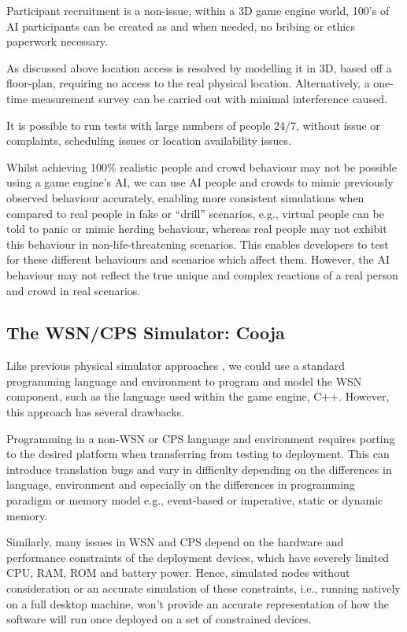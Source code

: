 Participant recruitment is a non-issue, within a 3D game engine world, 100's of AI participants can be created as and when needed, no bribing or ethics paperwork necessary. 

As discussed above location access is resolved by modelling it in 3D, based off a floor-plan, requiring no access to the real physical location. Alternatively, a one-time measurement survey can be carried out with minimal interference caused.

It is possible to run tests with large numbers of people 24/7, without issue or complaints, scheduling issues or location availability issues.

Whilst achieving 100\% realistic people and crowd behaviour may not be possible using a game engine's AI, we can use AI people and crowds to mimic previously observed behaviour accurately, enabling more consistent simulations when compared to real people in fake or ``drill'' scenarios, e.g., virtual people can be told to panic or mimic herding behaviour, whereas real people may not exhibit this behaviour in non-life-threatening scenarios. This enables developers to test for these different behaviours and scenarios which affect them. However, the AI behaviour may not reflect the true unique and complex reactions of a real person and crowd in real scenarios.

\subsection{The WSN/CPS Simulator: Cooja} %
\label{sub:a_wsn_cps_simulator}
Like previous physical simulator approaches \cite{6815220,simulink}, we could use a standard programming language and environment to program and model the WSN component, such as the language used within the game engine, C++. However, this approach has several drawbacks.

Programming in a non-WSN or CPS language and environment requires porting to the desired platform when transferring from testing to deployment. This can introduce translation bugs and vary in difficulty depending on the differences in language, environment and especially on the differences in programming paradigm or memory model e.g., event-based or imperative, static or dynamic memory. 

Similarly, many issues in WSN and CPS depend on the hardware and performance constraints of the deployment devices, which have severely limited CPU, RAM, ROM and battery power. Hence, simulated nodes without consideration or an accurate simulation of these constraints, i.e., running natively on a full desktop machine, won't provide an accurate representation of how the software will run once deployed on a set of constrained devices.

